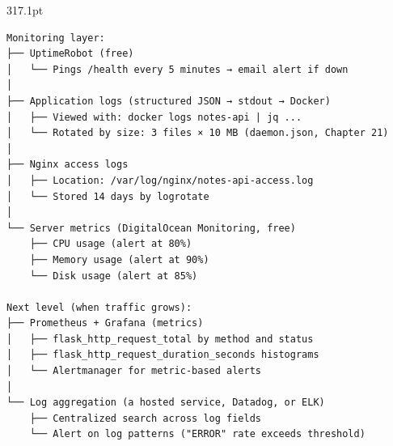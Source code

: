 \begin{diagrambox}[short]{317.1pt}
\begin{Verbatim}[fontsize=\fontsize{9.0}{8.55}\selectfont]
Monitoring layer:
├── UptimeRobot (free)
│   └── Pings /health every 5 minutes → email alert if down
│
├── Application logs (structured JSON → stdout → Docker)
│   ├── Viewed with: docker logs notes-api | jq ...
│   └── Rotated by size: 3 files × 10 MB (daemon.json, Chapter 21)
│
├── Nginx access logs
│   ├── Location: /var/log/nginx/notes-api-access.log
│   └── Stored 14 days by logrotate
│
└── Server metrics (DigitalOcean Monitoring, free)
    ├── CPU usage (alert at 80%)
    ├── Memory usage (alert at 90%)
    └── Disk usage (alert at 85%)

Next level (when traffic grows):
├── Prometheus + Grafana (metrics)
│   ├── flask_http_request_total by method and status
│   ├── flask_http_request_duration_seconds histograms
│   └── Alertmanager for metric-based alerts
│
└── Log aggregation (a hosted service, Datadog, or ELK)
    ├── Centralized search across log fields
    └── Alert on log patterns ("ERROR" rate exceeds threshold)
\end{Verbatim}
\end{diagrambox}

